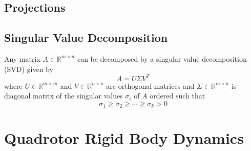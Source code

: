 \subsection{Projections}


\subsection{Singular Value Decomposition}
Any matrix $A \in \mathbb{R}^{m\times n}$ can be decomposed by a singular value decomposition (SVD) given by
\begin{equation*}
A = U\Sigma V^T
\end{equation*}
where $U \in \mathbb{R}^{m\times m}$ and $V \in \mathbb{R}^{n\times n}$ are orthogonal matrices and $\Sigma \in \mathbb{R}^{m\times n}$ is diagonal matrix of the singular values $\sigma_i$ of $A$ ordered such that
\begin{equation*}
\sigma_1 \geq \sigma_2 \geq \cdots \geq \sigma_k > 0
\end{equation*}


\section{Quadrotor Rigid Body Dynamics}